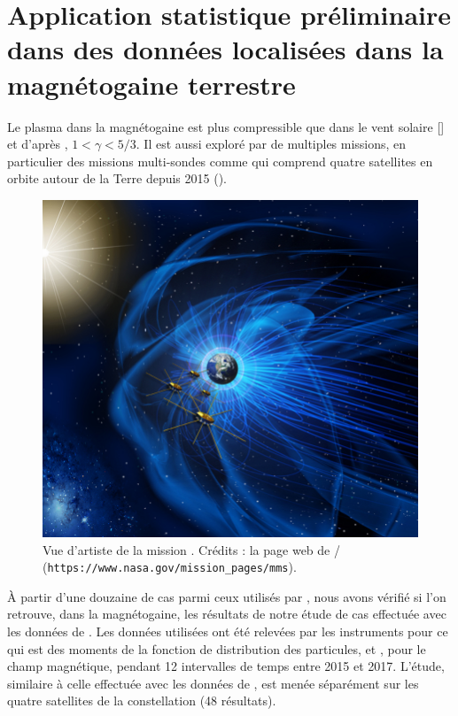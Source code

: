 \section{Application statistique préliminaire dans des données localisées dans la magnétogaine terrestre}
\label{sec-143}

Le plasma dans la magnétogaine est plus compressible que dans le vent solaire [\cite{hadid_compressible_2018}] et d'après \cite{livadiotis_long-term_2018}, $1<\gamma<5/3$. Il est aussi exploré par de multiples missions, en particulier des missions multi-sondes comme  qui comprend quatre satellites en orbite autour de la Terre depuis 2015 (). 
\begin{figure}[!ht]
 \centering
\includegraphics[width=0.7\linewidth,trim=0cm 6cm 6cm 4cm, clip=true]{./Mainmatter/Part_1/images/MMS_mission}
\cprotect\caption{Vue d'artiste de la mission . Crédits : la page web de / (\verb|https://www.nasa.gov/mission_pages/mms|).}
\label{fig:MMS}
\end{figure}

À partir d'une douzaine de cas parmi ceux utilisés par \cite{andres_energy_2019}, nous avons vérifié si l'on retrouve, dans la magnétogaine, les résultats de notre étude de cas effectuée avec les données de . Les données utilisées ont été relevées par les instruments  pour ce qui est des moments de la fonction de distribution des particules, et , pour le champ magnétique, pendant 12 intervalles de temps entre 2015 et 2017. L'étude, similaire à celle effectuée avec les données de , est menée séparément sur les quatre satellites de la constellation (48 résultats). 

